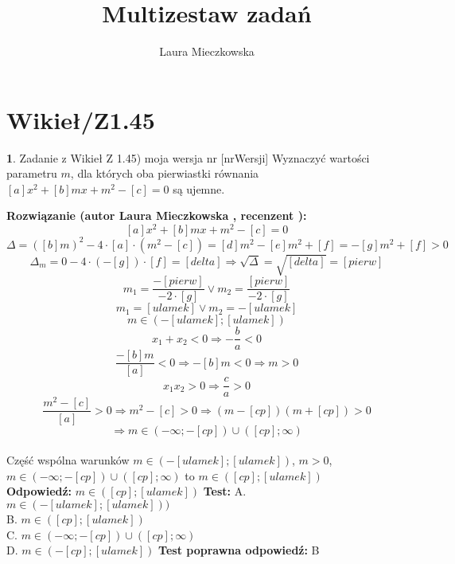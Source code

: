\documentclass[12pt, a4paper]{article}
\title{Multizestaw zadań}
\author{Laura Mieczkowska}
\date{}
\theoremstyle{definition} %
\newtheorem{zad}{}
\newcommand{\kategoria}[1]{\section{#1}} %
\newcommand{\zadStart}[1]{\begin{zad}#1\newline} %
\newcommand{\zadStop}{\end{zad}}   %
\newcommand{\rozwStart}[2]{\noindent \textbf{Rozwiązanie (autor #1 , recenzent #2): }\newline} %
\newcommand{\odpStart}{\noindent \textbf{Odpowiedź:}\newline}    %
\newcommand{\odpStop}{\newline}                                             %
\newcommand{\testStart}{\noindent \textbf{Test:}\newline} %
\newcommand{\testStop}{\newline} %
\newcommand{\kluczStart}{\noindent \textbf{Test poprawna odpowiedź:}\newline} %
\newcommand{\kluczStop}{\newline} %
\begin{document}
\maketitle


\kategoria{Wikieł/Z1.45}
\zadStart{Zadanie z Wikieł Z 1.45) moja wersja nr [nrWersji]}
Wyznaczyć wartości parametru $m$, dla których oba pierwiastki równania $[a]x^2+[b]mx+m^2-[c]=0$ są ujemne.
\zadStop
\rozwStart{Laura Mieczkowska}{}
$$[a]x^2+[b]mx+m^2-[c]=0$$
$$\Delta=([b]m)^2-4\cdot[a]\cdot(m^2-[c])=[d]m^2-[e]m^2+[f]=-[g]m^2+[f]>0$$
$$\Delta_m=0-4\cdot(-[g])\cdot[f]=[delta] \Rightarrow \sqrt{\Delta}=\sqrt{[delta]}=[pierw]$$
$$m_1=\frac{-[pierw]}{-2\cdot[g]} \vee m_2=\frac{[pierw]}{-2\cdot[g]}$$
$$m_1=[ulamek] \vee m_2=-[ulamek]$$
$$m\in (-[ulamek];[ulamek])$$
$$x_1+x_2<0 \Rightarrow -\frac{b}{a}<0$$
$$\frac{-[b]m}{[a]}<0 \Rightarrow -[b]m<0 \Rightarrow m>0$$
$$x_1x_2>0 \Rightarrow \frac{c}{a}>0$$
$$\frac{m^2-[c]}{[a]}>0 \Rightarrow m^2-[c]>0 \Rightarrow (m-[cp])(m+[cp])>0$$
$$\Rightarrow m\in(-\infty;-[cp])\cup([cp];\infty)$$
\\Część wspólna warunków $m\in (-[ulamek];[ulamek])$, $m>0$, $m\in(-\infty;-[cp])\cup([cp];\infty)$
to $m\in([cp];[ulamek])$ 
$$$$
\odpStart
$m\in([cp];[ulamek])$
\odpStop
\testStart
A. $m\in(-[ulamek];[ulamek]))$ \\
B. $m\in([cp];[ulamek])$ \\
C. $m\in(-\infty;-[cp])\cup([cp];\infty)$ \\
D. $m\in(-[cp];[ulamek])$ 
\testStop
\kluczStart
B
\kluczStop
\end{document}
